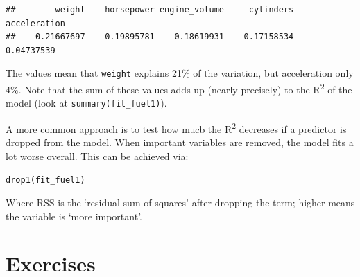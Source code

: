 \documentclass[]{book}
\newenvironment{Shaded}{\begin{snugshade}}{\end{snugshade}}
\newcommand{\CommentTok}[1]{\textcolor[rgb]{0.56,0.35,0.01}{\textit{#1}}}
\newcommand{\DataTypeTok}[1]{\textcolor[rgb]{0.13,0.29,0.53}{#1}}
\newcommand{\KeywordTok}[1]{\textcolor[rgb]{0.13,0.29,0.53}{\textbf{#1}}}
\newcommand{\NormalTok}[1]{#1}
\newcommand{\OperatorTok}[1]{\textcolor[rgb]{0.81,0.36,0.00}{\textbf{#1}}}
\newcommand{\OtherTok}[1]{\textcolor[rgb]{0.56,0.35,0.01}{#1}}
\newcommand{\StringTok}[1]{\textcolor[rgb]{0.31,0.60,0.02}{#1}}
\let\BeginKnitrBlock\begin \let\EndKnitrBlock\end
\begin{document}
\begin{Shaded}
\end{Shaded}

\begin{verbatim}
##        weight    horsepower engine_volume     cylinders  acceleration 
##    0.21667697    0.19895781    0.18619931    0.17158534    0.04737539
\end{verbatim}

The values mean that \texttt{weight} explains 21\% of the variation, but acceleration only 4\%. Note that the sum of these values adds up (nearly precisely) to the R\textsuperscript{2} of the model (look at \texttt{summary(fit\_fuel1)}).

\BeginKnitrBlock{rmdtry}
A more common approach is to test how mucb the R\textsuperscript{2} decreases if a predictor is dropped from the model. When important variables are removed, the model fits a lot worse overall. This can be achieved via:

\texttt{drop1(fit\_fuel1)}

Where RSS is the `residual sum of squares' after dropping the term; higher means the variable is `more important'.
\EndKnitrBlock{rmdtry}

\hypertarget{exercises-3}{%
\section{Exercises}\label{exercises-3}}
\end{document}
